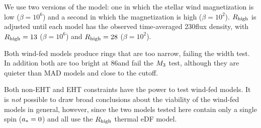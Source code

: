 We use two versions of the model: one in which the stellar wind magnetization is low ($\beta = 10^6$) and a second in which the magnetization is high ($\beta = 10^2$).
$R_\mathrm{high}$ is adjusted until each model has the observed time-averaged 230\GHz flux density, with $R_\mathrm{high} = 13$ ($\beta = 10^6$) and $R_\mathrm{high} = 28$ ($\beta = 10^2$).

Both wind-fed models produce rings that are too narrow, failing the \mring width test.
In addition both are too bright at 86\GHz and fail the $M_{3}$ test, although they are quieter than MAD models and close to the cutoff.

Both non-EHT and EHT constraints have the power to test wind-fed models.
It is {\em not} possible to draw broad conclusions about the viability of the wind-fed models in general, however, since the two models tested here contain only a single spin ($a_*=0$) and all use the $R_\mathrm{high}$ thermal eDF model.
